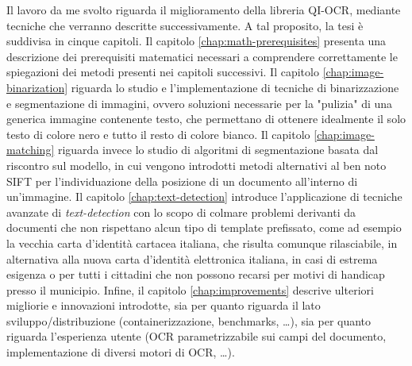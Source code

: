 Il lavoro da me svolto riguarda il miglioramento della libreria QI-OCR, mediante tecniche che verranno descritte successivamente. A tal proposito, la tesi \`e suddivisa in cinque capitoli. Il capitolo \ref{chap:math-prerequisites} presenta una descrizione dei prerequisiti matematici necessari a comprendere correttamente le spiegazioni dei metodi presenti nei capitoli successivi. Il capitolo \ref{chap:image-binarization} riguarda lo studio e l'implementazione di tecniche di binarizzazione e segmentazione di immagini, ovvero soluzioni necessarie per la "pulizia" di una generica immagine contenente testo, che permettano di ottenere idealmente il solo testo di colore nero e tutto il resto di colore bianco. Il capitolo \ref{chap:image-matching} riguarda invece lo studio di algoritmi di segmentazione basata dal riscontro sul modello, in cui vengono introdotti metodi alternativi al ben noto SIFT per l'individuazione della posizione di un documento all'interno di un'immagine. Il capitolo \ref{chap:text-detection} introduce l'applicazione di tecniche avanzate di \textit{text-detection} con lo scopo di colmare problemi derivanti da documenti che non rispettano alcun tipo di template prefissato, come ad esempio la vecchia carta d'identit\`a cartacea italiana, che risulta comunque rilasciabile, in alternativa alla nuova carta d'identit\`a elettronica italiana, in casi di estrema esigenza o per tutti i cittadini che non possono recarsi per motivi di handicap presso il municipio. Infine, il capitolo \ref{chap:improvements} descrive ulteriori migliorie e innovazioni introdotte, sia per quanto riguarda il lato sviluppo/distribuzione (containerizzazione, benchmarks, \dots), sia per quanto riguarda l'esperienza utente (OCR parametrizzabile sui campi del documento, implementazione di diversi motori di OCR, \dots).
